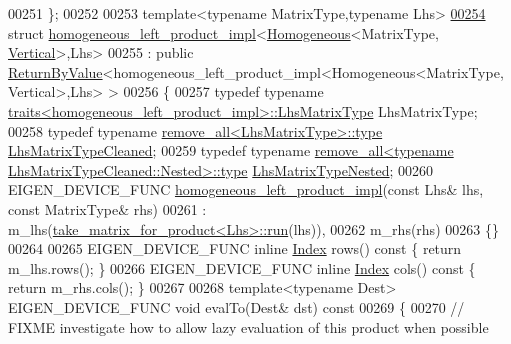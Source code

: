 \begin{DoxyCode}
00251 \};
00252 
00253 \textcolor{keyword}{template}<\textcolor{keyword}{typename} MatrixType,\textcolor{keyword}{typename} Lhs>
\hyperlink{struct_eigen_1_1internal_1_1homogeneous__left__product__impl_3_01_homogeneous_3_01_matrix_type_042480d8c61b8193bc4c7039abeeef67a}{00254} \textcolor{keyword}{struct }\hyperlink{struct_eigen_1_1internal_1_1homogeneous__left__product__impl}{homogeneous\_left\_product\_impl}<\hyperlink{group___geometry___module_class_eigen_1_1_homogeneous}{Homogeneous}<MatrixType,
      \hyperlink{group__enums_ggad49a7b3738e273eb00932271b36127f7addca718e0564723df21d61b94b1198be}{Vertical}>,Lhs>
00255   : \textcolor{keyword}{public} \hyperlink{group___core___module_class_eigen_1_1_return_by_value}{ReturnByValue}<homogeneous\_left\_product\_impl<Homogeneous<MatrixType,Vertical>,Lhs> >
00256 \{
00257   \textcolor{keyword}{typedef} \textcolor{keyword}{typename} \hyperlink{struct_eigen_1_1internal_1_1traits}{traits<homogeneous\_left\_product\_impl>::LhsMatrixType}
       LhsMatrixType;
00258   \textcolor{keyword}{typedef} \textcolor{keyword}{typename} \hyperlink{group___sparse_core___module}{remove\_all<LhsMatrixType>::type} 
      \hyperlink{group___sparse_core___module}{LhsMatrixTypeCleaned};
00259   \textcolor{keyword}{typedef} \textcolor{keyword}{typename} \hyperlink{group___sparse_core___module}{remove\_all<typename LhsMatrixTypeCleaned::Nested>::type}
       \hyperlink{group___sparse_core___module}{LhsMatrixTypeNested};
00260   EIGEN\_DEVICE\_FUNC \hyperlink{struct_eigen_1_1internal_1_1homogeneous__left__product__impl}{homogeneous\_left\_product\_impl}(\textcolor{keyword}{const} Lhs& lhs, \textcolor{keyword}{const} 
      MatrixType& rhs)
00261     : m\_lhs(\hyperlink{struct_eigen_1_1internal_1_1take__matrix__for__product}{take\_matrix\_for\_product<Lhs>::run}(lhs)),
00262       m\_rhs(rhs)
00263   \{\}
00264 
00265   EIGEN\_DEVICE\_FUNC \textcolor{keyword}{inline} \hyperlink{namespace_eigen_a62e77e0933482dafde8fe197d9a2cfde}{Index} rows()\textcolor{keyword}{ const }\{ \textcolor{keywordflow}{return} m\_lhs.rows(); \}
00266   EIGEN\_DEVICE\_FUNC \textcolor{keyword}{inline} \hyperlink{namespace_eigen_a62e77e0933482dafde8fe197d9a2cfde}{Index} cols()\textcolor{keyword}{ const }\{ \textcolor{keywordflow}{return} m\_rhs.cols(); \}
00267 
00268   \textcolor{keyword}{template}<\textcolor{keyword}{typename} Dest> EIGEN\_DEVICE\_FUNC \textcolor{keywordtype}{void} evalTo(Dest& dst)\textcolor{keyword}{ const}
00269 \textcolor{keyword}{  }\{
00270     \textcolor{comment}{// FIXME investigate how to allow lazy evaluation of this product when possible}

\end{DoxyCode}
